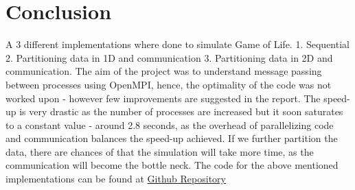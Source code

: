 \documentclass[a4paper, 10pt, conference]{IEEEtran}      %
\begin{document}
\section{Conclusion}
	 A 3 different implementations where done to simulate Game of Life. 1. Sequential 2. Partitioning data in 1D and communication 3. Partitioning data in 2D and communication. The aim of the project was to understand message passing between processes  using OpenMPI, hence, the optimality of the code was not worked upon - however few improvements are suggested in the report. The speed-up is very drastic as the number of processes are increased but it soon saturates to a constant value - around 2.8 seconds, as the overhead of parallelizing code and communication balances the speed-up achieved. If we further partition the data, there are chances of that the simulation will take more time, as the communication will become the bottle neck.
	 The code for the above mentioned implementations can be found at \href{https://github.com/chiragmajithia/High-Performance-Computing}{Github Repository}
	 
\end{document}
